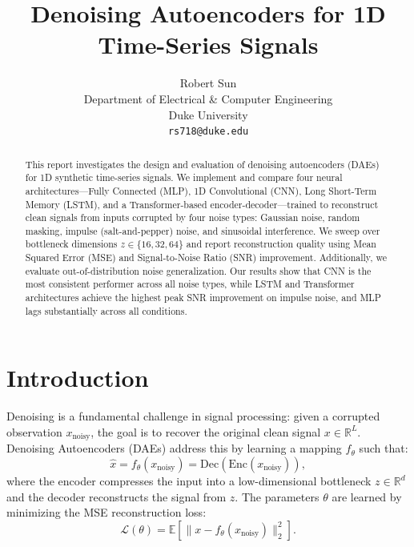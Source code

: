 \documentclass{article}
\title{Denoising Autoencoders for 1D Time-Series Signals}
\author{
    Robert Sun \\
    Department of Electrical \& Computer Engineering \\
    Duke University \\
    \texttt{rs718@duke.edu}
}
\begin{document}
\maketitle

\begin{abstract}
This report investigates the design and evaluation of denoising autoencoders (DAEs)
for 1D synthetic time-series signals. We implement and compare four neural
architectures---Fully Connected (MLP), 1D Convolutional (CNN), Long Short-Term Memory
(LSTM), and a Transformer-based encoder-decoder---trained to reconstruct clean signals
from inputs corrupted by four noise types: Gaussian noise, random masking, impulse
(salt-and-pepper) noise, and sinusoidal interference. We sweep over bottleneck
dimensions $z \in \{16, 32, 64\}$ and report reconstruction quality using Mean Squared
Error (MSE) and Signal-to-Noise Ratio (SNR) improvement. Additionally, we evaluate
out-of-distribution noise generalization. Our results show that CNN is the most
consistent performer across all noise types, while LSTM and Transformer architectures
achieve the highest peak SNR improvement on impulse noise, and MLP lags substantially
across all conditions.
\end{abstract}

\section{Introduction}

Denoising is a fundamental challenge in signal processing: given a corrupted observation
$x_{\text{noisy}}$, the goal is to recover the original clean signal $x \in \mathbb{R}^L$.
Denoising Autoencoders (DAEs) address this by learning a mapping $f_\theta$ such that:
\begin{equation}
    \hat{x} = f_\theta(x_{\text{noisy}}) = \text{Dec}(\text{Enc}(x_{\text{noisy}})),
\end{equation}
where the encoder compresses the input into a low-dimensional bottleneck $z \in \mathbb{R}^d$
and the decoder reconstructs the signal from $z$. The parameters $\theta$ are learned by
minimizing the MSE reconstruction loss:
\begin{equation}
    \mathcal{L}(\theta) = \mathbb{E}\left[\|x - f_\theta(x_{\text{noisy}})\|_{2}^2\right].
\end{equation}
\end{document}
